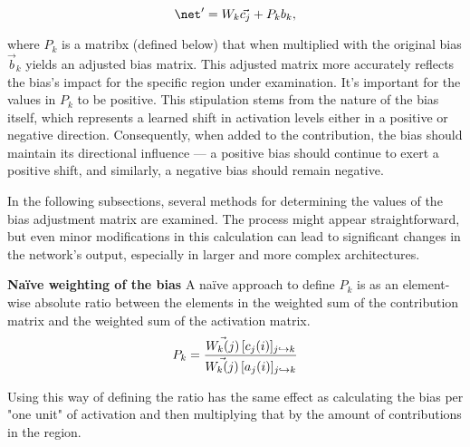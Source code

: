\begin{equation}
    \net^\prime = W_k \vec{c_j} +  P_{k}{b}_k,
\end{equation}

where $P_{k}$ is a matribx (defined below) that when multiplied with the original bias $\vec{b}_k$ yields an adjusted bias matrix. This adjusted matrix more accurately reflects the bias's impact for the specific region under examination. It's important for the values in $P_{k}$ to be positive. This stipulation stems from the nature of the bias itself, which represents a learned shift in activation levels either in a positive or negative direction. Consequently, when added to the contribution, the bias should maintain its directional influence --- a positive bias should continue to exert a positive shift, and similarly, a negative bias should remain negative.

In the following subsections, several methods for determining the values of the bias adjustment matrix are examined. The process might appear straightforward, but even minor modifications in this calculation can lead to significant changes in the network's output, especially in larger and more complex architectures.


\textbf{Naïve weighting of the bias}
\label{naive}
\newline
\newline
A naïve approach to define $P_{k}$ is as an element-wise absolute ratio between the elements in the weighted sum of the contribution matrix and the weighted sum of the activation matrix.
\begin{equation*}
    P_{k} = \dfrac{\vec{W_k(j)}\,[c_j(i)]_{j\hookrightarrow k}}{\vec{W_k(j)}\,[a_j(i)]_{j\hookrightarrow k}}
\end{equation*}

Using this way of defining the ratio has the same effect as calculating the bias per "one unit" of activation and then multiplying that by the amount of contributions in the region.

